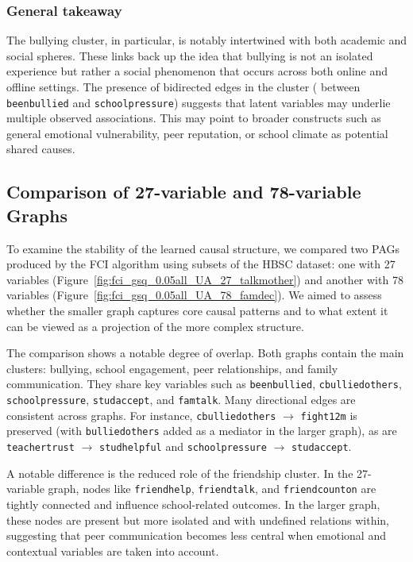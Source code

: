 \documentclass[main.tex]{subfiles}
\begin{document}
\subsubsection*{General takeaway}
The bullying cluster, in particular, is notably intertwined with both academic and social spheres. These links back up the idea that bullying is not an isolated experience but rather a social phenomenon that occurs across both online and offline settings. The presence of bidirected edges in the cluster ( between \texttt{beenbullied} and \texttt{schoolpressure}) suggests that latent variables may underlie multiple observed associations. This may point to broader constructs such as general emotional vulnerability, peer reputation, or school climate as potential shared causes. 

\subsection{Comparison of 27-variable and 78-variable Graphs}

To examine the stability of the learned causal structure, we compared two PAGs produced by the FCI algorithm using subsets of the HBSC dataset: one with 27 variables (Figure~\ref{fig:fci_gsq_0.05all_UA_27_talkmother}) and another with 78 variables (Figure~\ref{fig:fci_gsq_0.05all_UA_78_famdec}). We aimed to assess whether the smaller graph captures core causal patterns and to what extent it can be viewed as a projection of the more complex structure.

The comparison shows a notable degree of overlap. Both graphs contain the main clusters: bullying, school engagement, peer relationships, and family communication. They share key variables such as \texttt{beenbullied}, \texttt{cbulliedothers}, \texttt{schoolpressure}, \texttt{studaccept}, and \texttt{famtalk}. Many directional edges are consistent across graphs. For instance, \texttt{cbulliedothers} $\rightarrow$ \texttt{fight12m} is preserved (with \texttt{bulliedothers} added as a mediator in the larger graph), as are \texttt{teachertrust} $\rightarrow$ \texttt{studhelpful} and \texttt{schoolpressure} $\rightarrow$ \texttt{studaccept}.

A notable difference is the reduced role of the friendship cluster. In the 27-variable graph, nodes like \texttt{friendhelp}, \texttt{friendtalk}, and \texttt{friendcounton} are tightly connected and influence school-related outcomes. In the larger graph, these nodes are present but more isolated and with undefined relations within, suggesting that peer communication becomes less central when emotional and contextual variables are taken into account.
\end{document}
